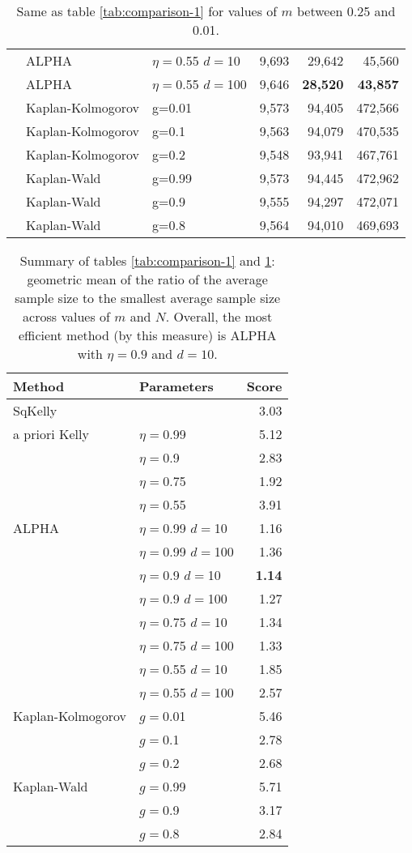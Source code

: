 \documentclass[12pt,runningheads]{llncs}
\begin{document}
{\begin{table}
\begin{tabular}{lll|rrr}
\cline{2-6}
& ALPHA & $\eta=$0.55 $d=$10 & 9,693  & 29,642  & 45,560  \\
& ALPHA & $\eta=$0.55 $d=$100 & 9,646  & \bf{28,520}  & \bf{43,857}  \\
\cline{2-6}
 & Kaplan-Kolmogorov & g=0.01 & 9,573  & 94,405  & 472,566  \\
 & Kaplan-Kolmogorov & g=0.1 & 9,563  & 94,079  & 470,535  \\
 & Kaplan-Kolmogorov & g=0.2 & 9,548  & 93,941  & 467,761  \\
\cline{2-6}
 & Kaplan-Wald & g=0.99 & 9,573  & 94,445  & 472,962  \\
 & Kaplan-Wald & g=0.9 & 9,555  & 94,297  & 472,071  \\
 & Kaplan-Wald & g=0.8 & 9,564  & 94,010  & 469,693 
\end{tabular}

\caption{\protect \label{tab:comparison-2} Same as table \ref{tab:comparison-1} for values of
$m$ between 0.25 and 0.01.}
\end{table}

\begin{table}
\centering
\tiny
\begin{tabular}{llr}\\ 
Method & Parameters & Score \\
\hline SqKelly & & 3.03 \\ 
 \hline a priori Kelly 
 & $\eta=$0.99 & 5.12 \\
 & $\eta=$0.9 & 2.83 \\
 & $\eta=$0.75 & 1.92 \\
 & $\eta=$0.55 & 3.91 \\
\hline ALPHA 
 & $\eta=$0.99 $d=$10 & 1.16 \\ 
 & $\eta=$0.99 $d=$100 & 1.36 \\ 
\cline{2-3}
 & $\eta=$0.9 $d=$10 & \bf{1.14} \\ 
 & $\eta=$0.9 $d=$100 & 1.27 \\ 
\cline{2-3}
 & $\eta=$0.75 $d=$10 & 1.34 \\ 
 & $\eta=$0.75 $d=$100 & 1.33 \\ 
\cline{2-3}
 & $\eta=$0.55 $d=$10 & 1.85 \\ 
 & $\eta=$0.55 $d=$100 & 2.57 \\ 
\cline{2-3}
\hline Kaplan-Kolmogorov
 & $g=$0.01 & 5.46\\ 
 & $g=$0.1 & 2.78\\ 
 & $g=$0.2 & 2.68\\ 
\hline Kaplan-Wald
 & $g=$0.99 & 5.71\\ 
 & $g=$0.9 & 3.17\\ 
 & $g=$0.8 & 2.84\\ 
\end{tabular}
\caption{\protect \label{tab:comparison-summary}
Summary of tables \ref{tab:comparison-1} and \ref{tab:comparison-2}: geometric mean of
the ratio of the average sample size to the smallest average sample size across values of $m$ and $N$.
Overall, the most efficient method (by this measure) is ALPHA with $\eta=0.9$ and $d=10$.}
\end{table}

}
\end{document}
